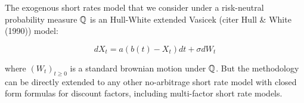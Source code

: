 % 
% 
% 
% 

The exogenous short rates model that we consider under a risk-neutral probability measure $\mathbb{Q}$ is an Hull-White extended Vasicek (citer Hull \& White (1990)) model: 

\begin{equation} 
\label{hw} dX_t = a(b(t) - X_t)dt + \sigma dW_t 
\end{equation} 

where $(W_t)_{t \geq 0}$ is a standard brownian motion under $\mathbb{Q}$. But the methodology can be directly extended to any other no-arbitrage short rate model with closed form formulas for discount factors, including multi-factor short rate models.

